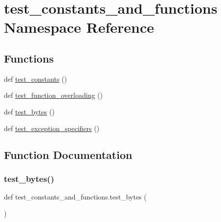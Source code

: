 \hypertarget{namespacetest__constants__and__functions}{}\section{test\+\_\+constants\+\_\+and\+\_\+functions Namespace Reference}
\label{namespacetest__constants__and__functions}
\subsection*{Functions}
\begin{DoxyCompactItemize}
\item 
def \mbox{\hyperlink{namespacetest__constants__and__functions_aa528a8e2e32968902d74f2ba53db518d}{test\+\_\+constants}} ()
\item 
def \mbox{\hyperlink{namespacetest__constants__and__functions_a40754455db0b1809508bee1a14926fe6}{test\+\_\+function\+\_\+overloading}} ()
\item 
def \mbox{\hyperlink{namespacetest__constants__and__functions_ad5c60bd45bf1aa9c8b240fb5f03d11da}{test\+\_\+bytes}} ()
\item 
def \mbox{\hyperlink{namespacetest__constants__and__functions_ae0f4dbe1c7c34abf404947cd564e1106}{test\+\_\+exception\+\_\+specifiers}} ()
\end{DoxyCompactItemize}


\subsection{Function Documentation}
\mbox{\label{namespacetest__constants__and__functions_ad5c60bd45bf1aa9c8b240fb5f03d11da}} 
\subsubsection{\texorpdfstring{test\_bytes()}{test\_bytes()}}
{\footnotesize\ttfamily def test\+\_\+constants\+\_\+and\+\_\+functions.\+test\+\_\+bytes (\begin{DoxyParamCaption}{ }\end{DoxyParamCaption})}

\mbox{\label{namespacetest__constants__and__functions_aa528a8e2e32968902d74f2ba53db518d}} 
